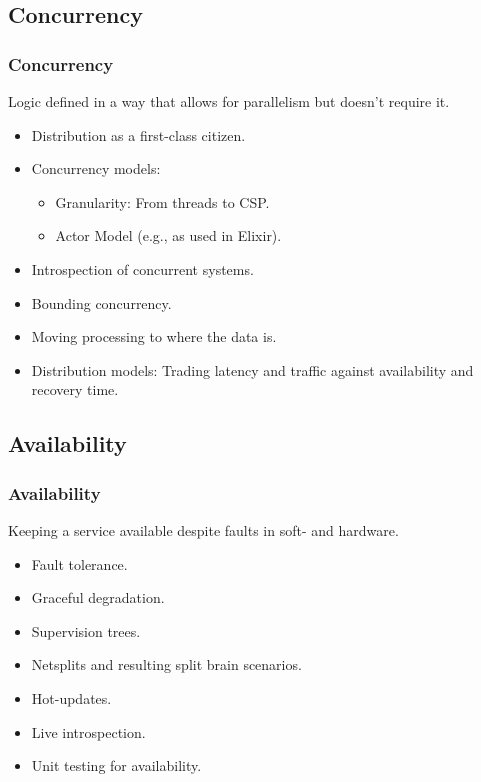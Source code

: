 \subsection{Concurrency}
\begin{frame}
    \frametitle{Concurrency}
    \vspace{3mm}
    Logic defined in a way that allows for parallelism but doesn't require it.
    \vspace{5mm}
    \begin{itemize}
        \item Distribution as a first-class citizen.
        \item Concurrency models:
          \begin{itemize}
            \item Granularity: From threads to CSP.
            \item Actor Model (e.g., as used in Elixir).
          \end{itemize}
        \item Introspection of concurrent systems.
        \item Bounding concurrency.
        \item Moving processing to where the data is.
        \item Distribution models: Trading latency and traffic against availability and recovery time.
    \end{itemize}
\end{frame}

\subsection{Availability}
\begin{frame}
    \frametitle{Availability}
    \vspace{3mm}
    Keeping a service available despite faults in soft- and hardware. 
    \vspace{5mm}
    \begin{itemize}
        \item Fault tolerance.
        \item Graceful degradation.
        \item Supervision trees.
        \item Netsplits and resulting split brain scenarios.
        \item Hot-updates.
        \item Live introspection.
        \item Unit testing for availability.
    \end{itemize}
\end{frame}

